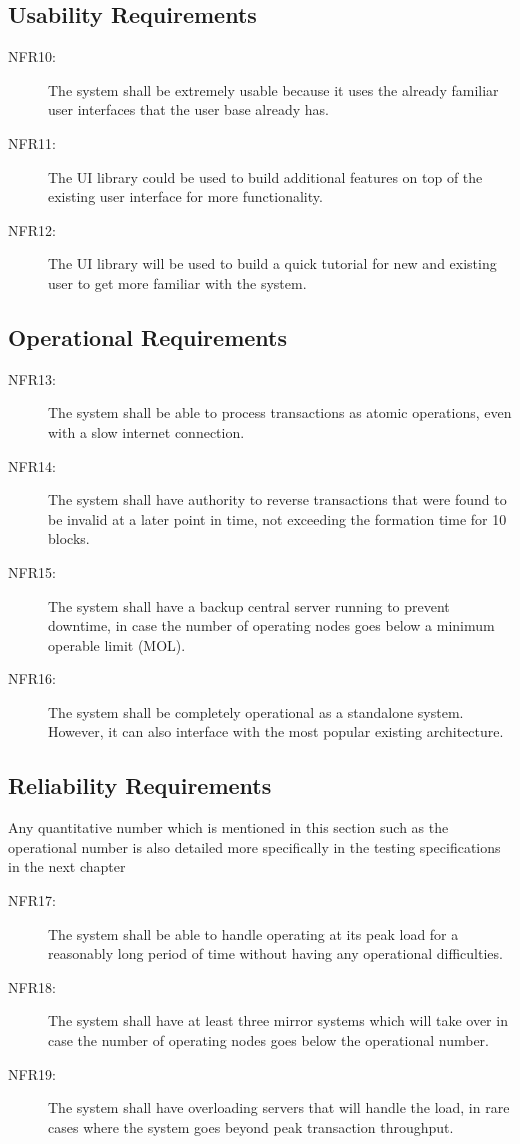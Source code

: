\documentclass[a4paper,twoside,phd]{BYUPhys}
\begin{document}
\subsection{Usability Requirements}
\begin{description}
\item[NFR10:] The system shall be extremely usable because it uses the already familiar user interfaces that the user base already has.
\item[NFR11:] The UI library could be used to build additional features on top of the existing user interface for more functionality.
\item[NFR12:] The UI library will be used to build a quick tutorial for new and existing user to get more familiar with the system.
\end{description}
\subsection{Operational Requirements}
\begin{description}
\item[NFR13:] The system shall be able to process transactions as atomic operations, even with a slow internet connection.
\item[NFR14:] The system shall have authority to reverse transactions that were found to be invalid at a later point in time, not exceeding the formation time for 10 blocks.
\item[NFR15:] The system shall have a backup central server running to prevent downtime, in case the number of operating nodes goes below a minimum operable limit (MOL).
\item[NFR16:] The system shall be completely operational as a standalone system. However, it can also interface with the most popular existing architecture.
\end{description}
\subsection{Reliability Requirements}
Any quantitative number which is mentioned in this section such as the operational number is also detailed more specifically in the testing specifications in the next chapter
\begin{description}
\item[NFR17:] The system shall be able to handle operating at its peak load for a reasonably long period of time without having any operational difficulties.
\item[NFR18:] The system shall have at least three mirror systems which will take over in case the number of operating nodes goes below the operational number. 
\item[NFR19:] The system shall have overloading servers that will handle the load, in rare cases where the system goes beyond peak transaction throughput.
\end{description}
\end{document}
